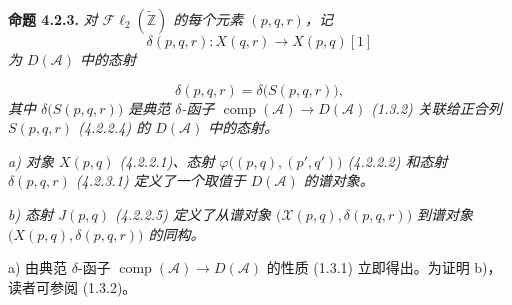 \medskip\noindent\textbf{命题 4.2.3.}\quad
\textit{对 $\mathcal{F}\ell_2(\widetilde{\mathbb Z})$ 的每个元素 $(p,q,r)$，记}
\[
\delta(p,q,r)\colon X(q,r)\longrightarrow X(p,q)[1]
\]
\noindent\textit{为 $D(\mathcal A)$ 中的态射}

\begin{equation}
\delta(p,q,r)=\delta\bigl(S(p,q,r)\bigr),
\tag{4.2.3.1}
\end{equation}
\noindent\textit{其中 $\delta\bigl(S(p,q,r)\bigr)$ 是典范 $\delta$-函子
$\operatorname{comp}(\mathcal A)\longrightarrow D(\mathcal A)$ (1.3.2)
关联给正合列 $S(p,q,r)$ (4.2.2.4) 的 $D(\mathcal A)$ 中的态射。}

\noindent\textit{a) 对象 $X(p,q)$ (4.2.2.1)、态射
$\varphi\bigl((p,q),(p',q')\bigr)$ (4.2.2.2) 和态射
$\delta(p,q,r)$ (4.2.3.1) 定义了一个取值于 $D(\mathcal A)$ 的谱对象。}

\noindent\textit{b) 态射 $J(p,q)$ (4.2.2.5) 定义了从谱对象
$\bigl(\mathcal X(p,q),\delta(p,q,r)\bigr)$ 到谱对象
$\bigl(X(p,q),\delta(p,q,r)\bigr)$ 的同构。}

a) 由典范 $\delta$-函子
$\operatorname{comp}(\mathcal A)\longrightarrow D(\mathcal A)$ 的性质
(1.3.1) 立即得出。为证明 b)，读者可参阅 (1.3.2)。
\endgroup
